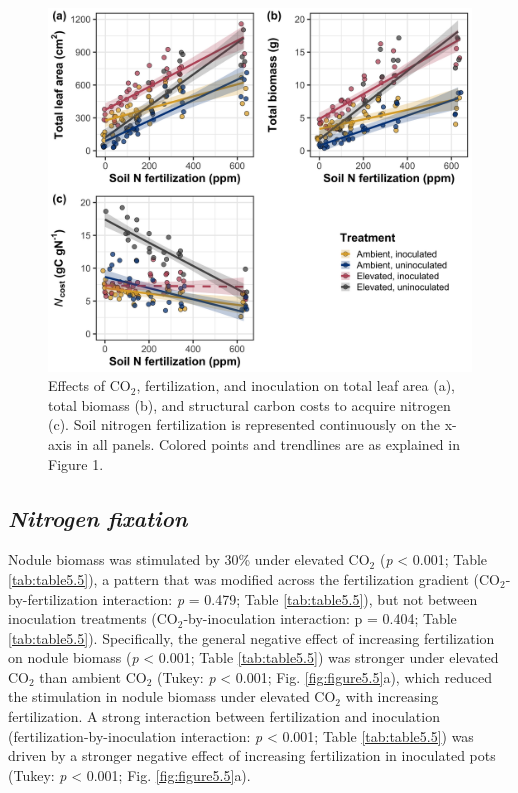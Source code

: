 \newpage
\begin{figure}
    \centering
    \includegraphics[scale = 0.074]{ch5_NxCO2xI/figs/NxCO2xI_fig4_wholePlant.png}
    \caption[Effects of CO$_2$, fertilization, and inoculation on total leaf area, total biomass, and structural carbon costs to acquire nitrogen.]{Effects of CO$_2$, fertilization, and inoculation on total leaf area (a), total biomass (b), and structural carbon costs to acquire nitrogen (c). Soil nitrogen fertilization is represented continuously on the x-axis in all panels. Colored points and trendlines are as explained in Figure 1.}
    \label{fig:figure5.4}
\end{figure}
\clearpage

\subsection{\textit{Nitrogen fixation}}
Nodule biomass was stimulated by 30\% under elevated CO$_2$ (\textit{p} < 0.001; Table \ref{tab:table5.5}), a pattern that was modified across the fertilization gradient (CO$_2$-by-fertilization interaction: \textit{p} = 0.479; Table \ref{tab:table5.5}), but not between inoculation treatments (CO$_2$-by-inoculation interaction: p = 0.404; Table \ref{tab:table5.5}). Specifically, the general negative effect of increasing fertilization on nodule biomass (\textit{p} < 0.001; Table \ref{tab:table5.5}) was stronger under elevated CO$_2$ than ambient CO$_2$ (Tukey: \textit{p} < 0.001; Fig. \ref{fig:figure5.5}a), which reduced the stimulation in nodule biomass under elevated CO$_2$ with increasing fertilization. A strong interaction between fertilization and inoculation (fertilization-by-inoculation interaction: \textit{p} < 0.001; Table \ref{tab:table5.5}) was driven by a stronger negative effect of increasing fertilization in inoculated pots (Tukey: \textit{p} < 0.001; Fig. \ref{fig:figure5.5}a).

